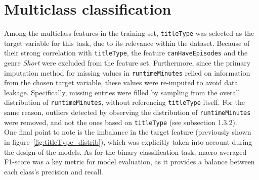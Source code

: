 \section{Multiclass classification}\label{sec:multiclass_classification}
Among the multiclass features in the training set, \texttt{titleType} was selected as the target variable
for this task, due to its relevance within the dataset. Because of their strong correlation with
\texttt{titleType}, the feature \texttt{canHaveEpisodes} and the genre \textit{Short} were excluded from the
feature set. Furthermore, since the primary imputation method for missing values in \texttt{runtimeMinutes}
relied on information from the chosen target variable, these values were re-imputed to avoid data leakage.
Specifically, missing entries were filled by sampling from the overall distribution of
\texttt{runtimeMinutes}, without referencing \texttt{titleType} itself. 
For the same reason, outliers detected by observing the distribution of \texttt{runtimeMinutes} were removed, 
and not the ones based on \texttt{titleType} (see subsection 1.3.2).\\

One final point to note is the imbalance in the target feature (previously shown in
figure~\ref{fig:titleType_distrib}), which was explicitly taken into account
during the design of the models. As for the binary classification task, macro-averaged F1-score was
a key metric for model evaluation, as it provides a balance between each class's precision and recall.




